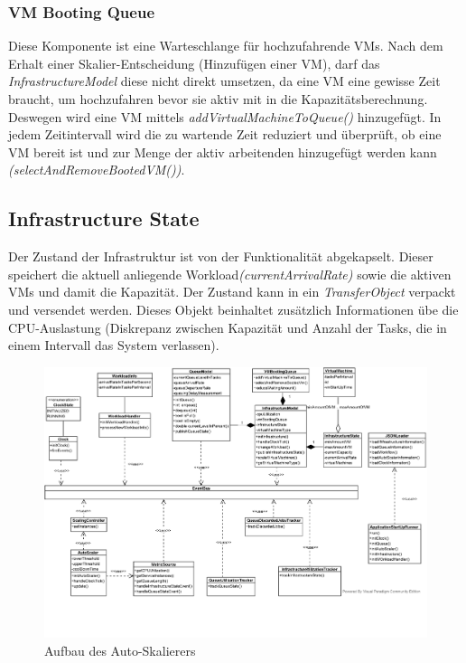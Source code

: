 \subsubsection{VM Booting Queue}
\label{sec:aufbau:BootinQueu}
Diese Komponente ist eine Warteschlange für hochzufahrende VMs. Nach dem Erhalt einer Skalier-Entscheidung (Hinzufügen einer VM), darf das \textit{InfrastructureModel} diese nicht direkt umsetzen, da eine VM eine gewisse Zeit braucht, um hochzufahren bevor sie aktiv mit in die Kapazitätsberechnung. Deswegen wird eine VM mittels \textit{addVirtualMachineToQueue()} hinzugefügt. In jedem Zeitintervall wird die zu wartende Zeit reduziert und überprüft, ob eine VM bereit ist und zur Menge der aktiv arbeitenden hinzugefügt werden kann \textit{(selectAndRemoveBootedVM())}.  


\subsection{Infrastructure State}
\label{sec:aufbau:State}
Der Zustand der Infrastruktur ist von der Funktionalität abgekapselt. Dieser speichert die aktuell anliegende Workload\textit{(currentArrivalRate)} sowie die aktiven VMs und damit die Kapazität. Der Zustand kann in ein \textit{TransferObject} verpackt und versendet werden. Dieses Objekt beinhaltet zusätzlich Informationen übe die CPU-Auslastung (Diskrepanz zwischen Kapazität und Anzahl der Tasks, die in einem Intervall das System verlassen).

\begin{figure}[!h]
	\centering
	\begin{sideways}
		\includegraphics[width=20.0cm, trim={0cm 0cm 0cm 0cm}]{img/classDiagram.pdf}
	\end{sideways}
	\caption{Aufbau des Auto-Skalierers}
	\label{fig:classDiagram}
\end{figure}

